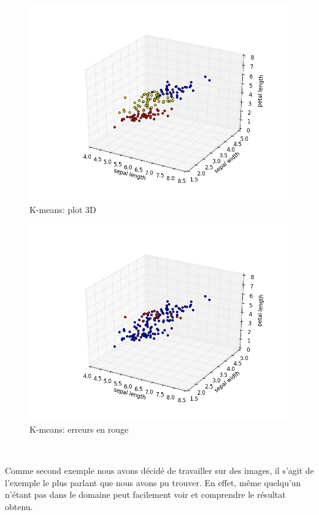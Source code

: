 \documentclass{article}
\begin{document}
  \begin{figure}[h]
    \centering
    \includegraphics[scale=0.5]{images/kmean-cluster.png}
    \caption{K-means: plot 3D}
    \label{fig:kmeans-cluster}
  \end{figure}

  \begin{figure}[h]
    \centering
    \includegraphics[scale=0.5]{images/kmean-false.png}
    \caption{K-means: erreurs en rouge}
    \label{fig:kmeans-errors}
  \end{figure}

  \

  Comme second exemple nous avons décidé de travailler sur des images, il s'agit
  de l'exemple le plus parlant que nous avons pu trouver. En effet, même quelqu'un
  n'étant pas dans le domaine peut facilement voir et comprendre le résultat obtenu.
\end{document}

